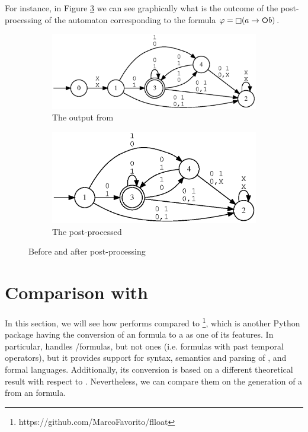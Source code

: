 For instance, in Figure \ref{fig:pre-post-automaton} we can see graphically what is the outcome of the post-processing of the automaton corresponding to the formula $\varphi = \Always (a \rightarrow \Next b)$.
\begin{figure}[h]
\centering
\begin{subfigure}{.5\textwidth}
  \centering
  \includegraphics[width=\linewidth]{images/pre-automaton.eps}
  \caption{The \DFA output from \MONA}
  \label{fig:mona-output}
\end{subfigure}%
\begin{subfigure}{.5\textwidth}
  \centering
  \includegraphics[width=\linewidth]{images/post-automaton.eps}
  \caption{The \DFA post-processed}
  \label{fig:automa-post-processed}
\end{subfigure}
\caption{Before and after \DFA post-processing}
\label{fig:pre-post-automaton}
\end{figure}
\section{Comparison with \FLLOAT}
In this section, we will see how \LTLfToDFA performs compared to \href{https://pypi.org/project/flloat/}{\FLLOAT}\footnote{https://github.com/MarcoFavorito/flloat}, which is another Python package having the conversion of an \LTLf formula to a \DFA as one of its features.
In particular, \FLLOAT handles \LTLf/\LDLf formulas, but not \PLTL ones (i.e. \LTLf formulas with past temporal operators), but it provides support for syntax, semantics and parsing of \PL, \LTLf and \LDLf formal languages.  Additionally, its conversion is based on a different theoretical result with respect to \LTLfToDFA. Nevertheless, we can compare them on the generation of a \DFA from an \LTLf formula.

